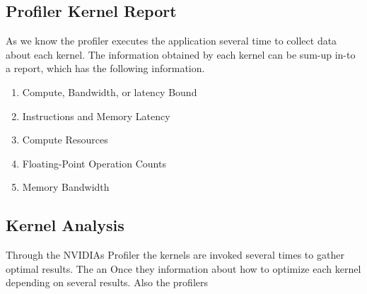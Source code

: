\subsection{Profiler Kernel Report}

As we know the profiler executes the application several time to collect data about each kernel. The information obtained by each kernel can be sum-up in-to a report, which has the following information.

\begin{enumerate}
  \item Compute, Bandwidth, or latency Bound
  \item Instructions and Memory Latency
  \item Compute Resources
  \item Floating-Point Operation Counts
  \item Memory Bandwidth
\end{enumerate}


\subsection{Kernel Analysis}

Through the NVIDIAs Profiler the kernels are invoked several times to gather optimal results. The an Once they information about how to optimize each kernel depending on several results. Also the profilers



